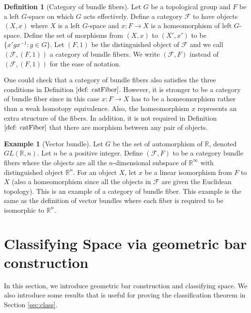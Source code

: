 \documentclass[psamsfonts]{amsart}
\newcommand{\hana}[1]{{\color{violet}{#1}}}
\theoremstyle{definition}
\newtheorem{defn}[thm]{Definition}
\newtheorem{exmp}[thm]{Example}
\theoremstyle{remark}
\numberwithin{equation}{section}
\begin{document}
\hana{the comments for things above were sent to you via email.}
\begin{defn}[Category of bundle fibers]
Let $G$ be a topological group and $F$ be a left $G$-space on which $G$ acts effectively. Define a category $\mathcal{F}$ to have objects $(X, x)$ where $X$ is a left $G$-space and $x: F \to X$ is a homeomorphism of left $G$-space. Define the set of morphisms from $(X, x)$ to $(X', x')$ to be $\{x'gx^{-1}: g \in G\}$. Let $(F, 1)$ be the distinguished object of $\mathcal{F}$ and we call $(\mathcal{F}, (F, 1))$ a category of bundle fibers. We write $(\mathcal{F}, F)$ instead of $(\mathcal{F}, (F, 1))$ for the ease of notation.
\end{defn}

One could check that a category of bundle fibers also satisfies the three conditions in Definition $\ref{def: catFiber}$. However, it is stronger to be a category of bundle fiber since in this case $x: F \to X$ has to be a homeomorphism rather than a weak homotopy equivalence. Also, the homeomorphism $x$ represents an extra structure of the fibers. In addition, it is not required in Definition $\ref{def: catFiber}$ that there are morphism between any pair of objects.

\begin{exmp}[Vector bundle]
Let $G$ be the set of automorphism of $\mathbb{R}$, denoted $GL(\mathbb{R}, n)$. Let $n$ be a positive integer. Define $(\mathcal{F}, F)$ to be a category bundle fibers where the objects are all the $n$-dimensional subspace of $\mathbb{R}^{\infty}$ with distinguished object $\mathbb{R}^{n}$. For an object $X$, let $x$ be a linear isomorphism from $F$ to $X$ (also a homeomorphism since all the objects in $\mathcal{F}$ are given the Euclidean topology). This is an example of a category of bundle fiber. This example is the same as the definition of vector bundles where each fiber is required to be isomorphic to $\mathbb{R}^{n}$.
\end{exmp}






\section{Classifying Space via geometric bar construction}
In this section, we introduce geometric bar construction and classifying space. We also introduce some results that is useful for proving the classification theorem in Section \ref{sec:class}.
\end{document}
